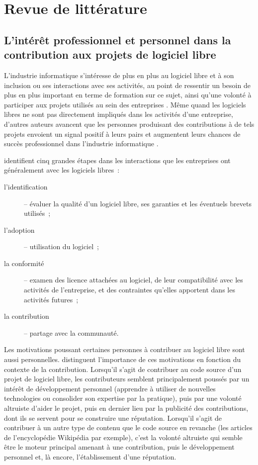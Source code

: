 \chapter{Revue de littérature}

\section{L'intérêt professionnel et personnel dans la contribution aux projets de logiciel libre}

L'industrie informatique s'intéresse de plus en plus au logiciel libre et à son inclusion ou ses interactions
avec ses activités, au point de ressentir un besoin de plus en plus important en terme de formation sur ce
sujet, ainsi qu'une volonté à participer aux projets utilisés au sein des entreprises
. Même quand les logiciels libres ne sont pas directement impliqués dans les
activités d'une entreprise, d'autres auteurs avancent que les personnes produisant des contributions à de tels
projets envoient un signal positif à leurs pairs et augmentent leurs chances de succès professionnel dans
l'industrie informatique .

\textcite{strategies-2012} identifient cinq grandes étapes dans les interactions que les entreprises ont
généralement avec les logiciels libres :
\begin{description}
    \item[l'identification] -- évaluer la qualité d'un logiciel libre, ses garanties et les éventuels brevets
        utilisés ;
    \item[l'adoption] -- utilisation du logiciel ;
    \item[la conformité] -- examen des licence attachées au logiciel, de leur compatibilité avec les activités
        de l'entreprise, et des contraintes qu'elles apportent dans les activités futures ;
    \item[la contribution] -- partage avec la communauté.
\end{description}

Les motivations poussant certaines personnes à contribuer au logiciel libre sont aussi personnelles.
 distinguent l'importance de ces motivations en fonction du contexte
de la contribution. Lorsqu'il s'agit de contribuer au code source d'un projet de logiciel libre, les
contributeurs semblent principalement poussés par un intérêt de développement personnel (apprendre à utiliser
de nouvelles technologies ou consolider son expertise par la pratique), puis par une volonté altruiste d'aider
le projet, puis en dernier lieu par la publicité des contributions, dont ils se servent pour se construire une
réputation. Lorsqu'il s'agit de contribuer à un autre type de contenu que le code source en revanche (les
articles de l'encyclopédie Wikipédia par exemple), c'est la volonté altruiste qui semble être le moteur
principal amenant à une contribution, puis le développement personnel et, là encore, l'établissement d'une
réputation.


